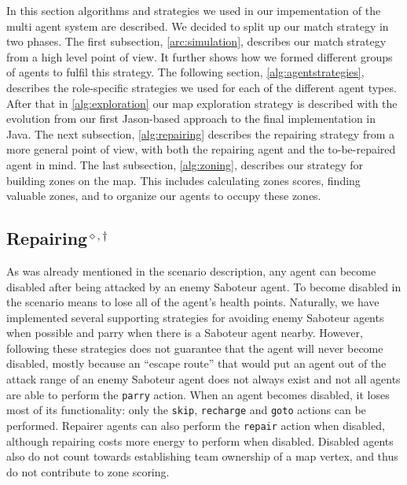 In this section algorithms and strategies we used in our impementation of the multi agent system are described.
We decided to split up our match strategy in two phases.
The first subsection, \autoref{arc:simulation}, describes our match strategy from a high level point of view.
It further shows how we formed different groups of agents to fulfil this strategy.
The following section, \autoref{alg:agentstrategies}, describes the role-specific strategies we used for each of the different agent types.
After that in \autoref{alg:exploration} our map exploration strategy is described with the evolution from our first Jason-based approach to the final implementation in Java.
The next subsection, \autoref{alg:repairing} describes the repairing strategy from a more general point of view, with both the repairing agent and the to-be-repaired agent in mind.
The last subsection, \autoref{alg:zoning}, describes our strategy for building zones on the map.
This includes calculating zones scores, finding valuable zones, and to organize our agents to occupy these zones.





\subsection[Repairing]{Repairing$^{\diamond,\dagger}$}\label{alg:repairing}
As was already mentioned in the scenario description, any agent can become disabled after being attacked by an enemy Saboteur agent.
To become disabled in the scenario means to lose all of the agent's health points.
Naturally, we have implemented several supporting strategies for avoiding enemy Saboteur agents when possible and parry when there is a Saboteur agent nearby.
However, following these strategies does not guarantee that the agent will never become disabled, mostly because an \enquote{escape route} that would put an agent out of the attack range of an enemy Saboteur agent does not always exist and not all agents are able to perform the \texttt{parry} action.
When an agent becomes disabled, it loses most of its functionality: only the \texttt{skip}, \texttt{recharge} and \texttt{goto} actions can be performed.
Repairer agents can also perform the \texttt{repair} action when disabled, although repairing costs more energy to perform when disabled.
Disabled agents also do not count towards establishing team ownership of a map vertex, and thus do not contribute to zone scoring.

